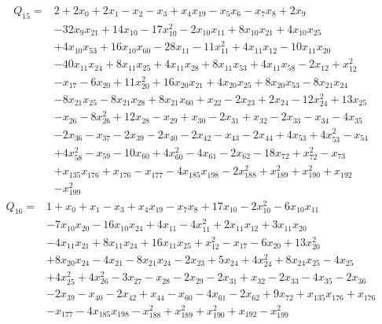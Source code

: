 \begin{equation*}\begin{aligned}
Q_{15}={}& 2+2x_{0}+2x_{1}-x_{2}-x_{3}+x_{4}x_{19}-x_{5}x_{6}-x_{7}x_{8}+2x_{9}\\
& -32x_{9}x_{21}+14x_{10}-17x_{10}^{2}-2x_{10}x_{11}+8x_{10}x_{21}+4x_{10}x_{25}\\
& +4x_{10}x_{53}+16x_{10}x_{60}-28x_{11}-11x_{11}^{2}+4x_{11}x_{12}-10x_{11}x_{20}\\
& -40x_{11}x_{24}+8x_{11}x_{25}+4x_{11}x_{28}+8x_{11}x_{53}+4x_{11}x_{58}-2x_{12}+x_{12}^{2}\\
& -x_{17}-6x_{20}+11x_{20}^{2}+16x_{20}x_{21}+4x_{20}x_{25}+8x_{20}x_{53}-8x_{21}x_{24}\\
& -8x_{21}x_{25}-8x_{21}x_{28}+8x_{21}x_{60}+x_{22}-2x_{23}+2x_{24}-12x_{24}^{2}+13x_{25}\\
& -x_{26}-8x_{26}^{2}+12x_{28}-x_{29}+x_{30}-2x_{31}+x_{32}-2x_{33}-x_{34}-4x_{35}\\
& -2x_{36}-x_{37}-2x_{39}-2x_{40}-2x_{42}-x_{43}-2x_{44}+4x_{53}+4x_{53}^{2}-x_{54}\\
& +4x_{58}^{2}-x_{59}-10x_{60}+4x_{60}^{2}-4x_{61}-2x_{62}-18x_{72}+x_{72}^{2}-x_{73}\\
& +x_{135}x_{176}+x_{176}-x_{177}-4x_{185}x_{198}-2x_{188}^{2}+x_{189}^{2}+x_{190}^{2}+x_{192}\\
& -x_{199}^{2}
\end{aligned}\end{equation*}
\begin{equation*}\begin{aligned}
Q_{16}={}& 1+x_{0}+x_{1}-x_{3}+x_{4}x_{19}-x_{7}x_{8}+17x_{10}-2x_{10}^{2}-6x_{10}x_{11}\\
& -7x_{10}x_{20}-16x_{10}x_{24}+4x_{11}-4x_{11}^{2}+2x_{11}x_{12}+3x_{11}x_{20}\\
& -4x_{11}x_{21}+8x_{11}x_{24}+16x_{11}x_{25}+x_{12}^{2}-x_{17}-6x_{20}+13x_{20}^{2}\\
& +8x_{20}x_{24}-4x_{21}-8x_{21}x_{24}-2x_{23}+5x_{24}+4x_{24}^{2}+8x_{24}x_{25}-4x_{25}\\
& +4x_{25}^{2}+4x_{26}^{2}-3x_{27}-x_{28}-2x_{29}-2x_{31}+x_{32}-2x_{33}-4x_{35}-2x_{36}\\
& -2x_{39}-x_{40}-2x_{42}+x_{44}-x_{60}-4x_{61}-2x_{62}+9x_{72}+x_{135}x_{176}+x_{176}\\
& -x_{177}-4x_{185}x_{198}-x_{188}^{2}+x_{189}^{2}+x_{190}^{2}+x_{192}-x_{199}^{2}
\end{aligned}\end{equation*}
